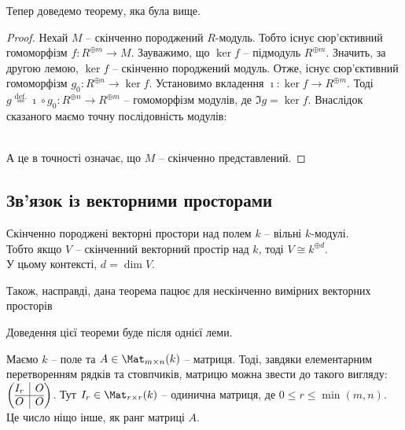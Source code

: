 \documentclass{math_library}
\begin{document}
Тепер доведемо теорему, яка була вище.
\begin{proof}
Нехай $M$ -- скінченно породжений $R$-модуль. Тобто існує сюр'єктивний гомоморфізм $f \colon R^{\oplus m} \to M$. Зауважимо, що $\ker f$ -- підмодуль $R^{\oplus m}$. Значить, за другою лемою, $\ker f$ -- скінченно породжений модуль. Отже, існує сюр'єктивний гомоморфізм $g_0 \colon R^{\oplus n} \to \ker f$. Установимо вкладення $\imath \colon \ker f \to R^{\oplus m}$. Тоді $g \overset{\text{def.}}{=} \imath \circ g_0 \colon R^{\oplus n} \to R^{\oplus m}$ -- гомоморфізм модулів, де $\Im g = \ker f$. Внаслідок сказаного маємо точну послідовність модулів:\\
\\
А це в точності означає, що $M$ -- скінченно представлений.
\end{proof}

\subsection{Зв'язок із векторними просторами}
\begin{theorem}
Скінченно породжені векторні простори над полем $k$ -- вільні $k$-модулі.\\
Тобто якщо $V$ -- скінченний векторний простір над $k$, тоді $V \cong k^{\oplus d}$.\\
У цьому контексті, $d = \dim V$.
\end{theorem}

\begin{remark}
Також, насправді, дана теорема пацює для нескінченно вимірних векторних просторів
\end{remark}

Доведення цієї теореми буде після однієї леми.

\begin{lemma}
Маємо $k$ -- поле та $A \in \Mat_{m \times n}(k)$ -- матриця. Тоді, завдяки елементарним перетворенням рядків та стовпчиків, матрицю можна звести до такого вигляду:
$\left(\begin{array}{@{}c|c@{}}
I_r & O \\
\hline
O & O
\end{array} \right)$. Тут $I_r \in \Mat_{r \times r}(k)$ -- одинична матриця, де $0 \leq r \leq \min(m,n)$. Це число ніщо інше, як ранг матриці $A$.
\end{lemma}
\end{document}

